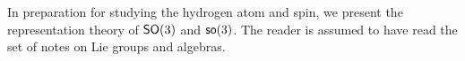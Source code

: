 In preparation for studying the hydrogen atom and spin, we present the representation theory of $\operatorname{\textsf{SO}}(3)$ and $\operatorname{\textsf{so}}(3)$. The reader is assumed to have read the set of notes on Lie groups and algebras.
